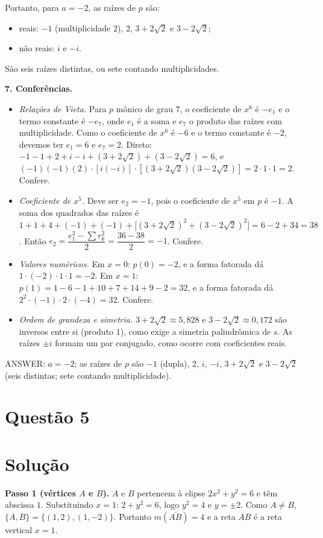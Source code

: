 \documentclass{article}%
\begin{document}
Portanto, para $a=-2$, as raízes de $p$ são:
\begin{itemize}
\item reais: $-1$ (multiplicidade $2$), $2$, $3+2\sqrt{2}$ e $3-2\sqrt{2}$;
\item não reais: $i$ e $-i$.
\end{itemize}
São seis raízes distintas, ou sete contando multiplicidades.

\textbf{7. Conferências.}
\begin{itemize}
\item \emph{Relações de Vieta.} Para $p$ mônico de grau $7$, o coeficiente de $x^6$ é $-e_1$ e o termo constante é $-e_7$, onde $e_1$ é a soma e $e_7$ o produto das raízes com multiplicidade. Como o coeficiente de $x^6$ é $-6$ e o termo constante é $-2$, devemos ter $e_1=6$ e $e_7=2$. Direto: $-1-1+2+i-i+(3+2\sqrt{2})+(3-2\sqrt{2})=6$, e $(-1)(-1)(2)\cdot[i(-i)]\cdot[(3+2\sqrt{2})(3-2\sqrt{2})]=2\cdot1\cdot1=2$. Confere.
\item \emph{Coeficiente de $x^5$.} Deve ser $e_2=-1$, pois o coeficiente de $x^5$ em $p$ é $-1$. A soma dos quadrados das raízes é $1+1+4+(-1)+(-1)+\big[(3+2\sqrt{2})^2+(3-2\sqrt{2})^2\big]=6-2+34=38$. Então $e_2=\dfrac{e_1^2-\sum r_k^2}{2}=\dfrac{36-38}{2}=-1$. Confere.
\item \emph{Valores numéricos.} Em $x=0$: $p(0)=-2$, e a forma fatorada dá $1\cdot(-2)\cdot1\cdot1=-2$. Em $x=1$: $p(1)=1-6-1+10+7+14+9-2=32$, e a forma fatorada dá $2^2\cdot(-1)\cdot2\cdot(-4)=32$. Confere.
\item \emph{Ordem de grandeza e simetria.} $3+2\sqrt{2}\approx5{,}828$ e $3-2\sqrt{2}\approx0{,}172$ são inversos entre si (produto $1$), como exige a simetria palindrômica de $s$. As raízes $\pm i$ formam um par conjugado, como ocorre com coeficientes reais.
\end{itemize}

ANSWER: $a=-2$; as raízes de $p$ são $-1$ (dupla), $2$, $i$, $-i$, $3+2\sqrt{2}$ e $3-2\sqrt{2}$ (seis distintas; sete contando multiplicidade).%
\newpage%
\section*{Questão 5}

\section*{Solução}

\textbf{Passo 1 (vértices $A$ e $B$).} $A$ e $B$ pertencem à elipse $2x^2+y^2=6$ e têm abscissa $1$. Substituindo $x=1$: $2+y^2=6$, logo $y^2=4$ e $y=\pm 2$. Como $A\neq B$, $\{A,B\}=\{(1,2),(1,-2)\}$. Portanto $m(\overline{AB})=4$ e a reta $AB$ é a reta vertical $x=1$.
\end{document}
